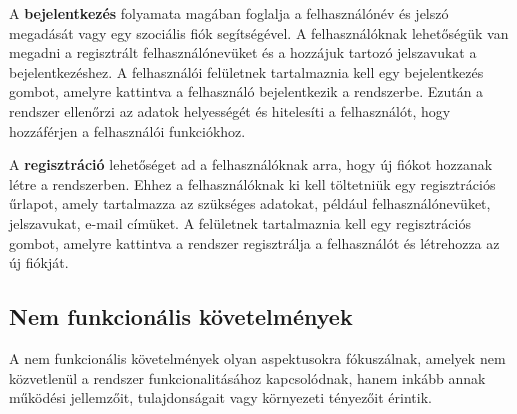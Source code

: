 \begin{itemize}
A \textbf{bejelentkezés} folyamata magában foglalja a felhasználónév és jelszó megadását vagy egy szociális fiók segítségével. A felhasználóknak lehetőségük van megadni a regisztrált felhasználónevüket és a hozzájuk tartozó jelszavukat a bejelentkezéshez. A felhasználói felületnek tartalmaznia kell egy bejelentkezés gombot, amelyre kattintva a felhasználó bejelentkezik a rendszerbe. Ezután a rendszer ellenőrzi az adatok helyességét és hitelesíti a felhasználót, hogy hozzáférjen a felhasználói funkciókhoz.

A \textbf{regisztráció} lehetőséget ad a felhasználóknak arra, hogy új fiókot hozzanak létre a rendszerben. Ehhez a felhasználóknak ki kell töltetniük egy regisztrációs űrlapot, amely tartalmazza az szükséges adatokat, például felhasználónevüket, jelszavukat, e-mail címüket. A felületnek tartalmaznia kell egy regisztrációs gombot, amelyre kattintva a rendszer regisztrálja a felhasználót és létrehozza az új fiókját.
\end{itemize}

\subsection {Nem funkcionális követelmények}

A nem funkcionális követelmények olyan aspektusokra fókuszálnak, amelyek nem közvetlenül a rendszer funkcionalitásához kapcsolódnak, hanem inkább annak működési jellemzőit, tulajdonságait vagy környezeti tényezőit érintik.

